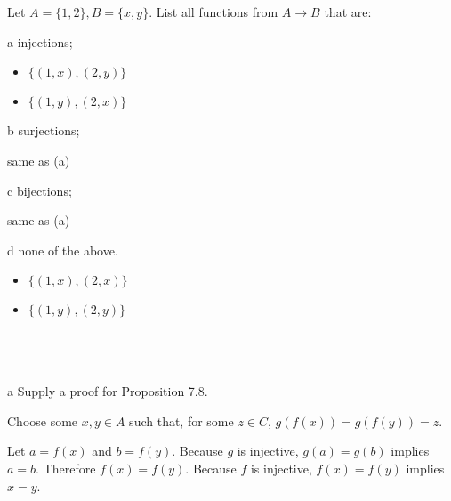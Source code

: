 \documentclass{article}
\begin{document}
\section{}

\begin{problem*}
Let $A = \{1, 2\}, B = \{x, y\}$. List all functions from $A \to B$ that are:
\end{problem*}

\begin{problem} a
injections;
\end{problem}


\begin{itemize}
\item $\{( 1,x) ,( 2,y)\}$
\item $\{( 1,y) ,( 2,x)\}$
\end{itemize}


\begin{problem} b
surjections; 
\end{problem}

same as (a)

\begin{problem} c
bijections; 
\end{problem}

same as (a)

\begin{problem} d
none of the above.
\end{problem}


\begin{itemize}
\item $\{( 1,x) ,( 2,x)\}$
\item $\{( 1,y) ,( 2,y)\}$
\end{itemize}

\
\hline
\section{}

\begin{problem} a
Supply a proof for Proposition 7.8.
\end{problem}

Choose some $x,y\in A$ such that, for some $z\in C$, $g( f( x)) =g( f( y)) =z$. 

Let $a=f( x)$ and $b=f( y)$. Because $g$ is injective, $g( a) =g( b)$ implies $a=b$. Therefore $f( x) =f( y)$. Because $f$ is injective, $f( x) =f( y)$ implies $x=y$. 
\end{document}
